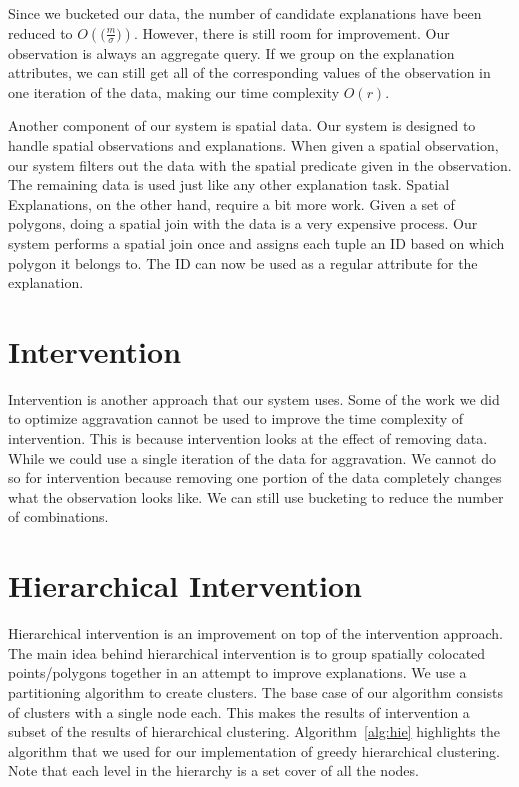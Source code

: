 Since we bucketed our data, the number of candidate explanations have been reduced to $O(\big(\frac{m}{\sigma}\big))$. However, there is still room for improvement. Our observation is always an aggregate query. If we group on the explanation attributes, we can still get all of the corresponding values of the observation in one iteration of the data, making our time complexity $O(r)$.

Another component of our system is spatial data. Our system is designed to handle spatial observations and explanations. When given a spatial observation, our system filters out the data with the spatial predicate given in the observation. The remaining data is used just like any other explanation task. Spatial Explanations, on the other hand, require a bit more work. Given a set of polygons, doing a spatial join with the data is a very expensive process. Our system performs a spatial join once and assigns each tuple an ID based on which polygon it belongs to. The ID can now be used as a regular attribute for the explanation.

\section{Intervention}
\label{intervention_impl}

Intervention is another approach that our system uses. Some of the work we did to optimize aggravation cannot be used to improve the time complexity of intervention. This is because intervention looks at the effect of removing data. While we could use a single iteration of the data for aggravation. We cannot do so for intervention because removing one portion of the data completely changes what the observation looks like. We can still use bucketing to reduce the number of combinations.


\section{Hierarchical Intervention}
\label{sec:hie_impl}
Hierarchical intervention is an improvement on top of the intervention approach. The main idea behind hierarchical intervention is to group spatially colocated points/polygons together in an attempt to improve explanations. We use a partitioning algorithm to create clusters. The base case of our algorithm consists of clusters with a single node each. This makes the results of intervention a subset of the results of hierarchical clustering. Algorithm~\ref{alg:hie} highlights the algorithm that we used for our implementation of greedy hierarchical clustering. Note that each level in the hierarchy is a set cover of all the nodes.


